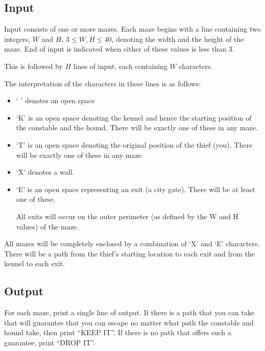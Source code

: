 \subsection*{Input}

Input consists of one or more mazes. Each maze begins with a line
containing two integers, $W$ and $H$, $3 \leq W,H \leq 40$, 
denoting the width and the height of
the maze. End of input is indicated when either of these values is
less than $3$.

This is followed by $H$ lines of input, each containing $W$
characters. 

The interpretation of the characters in these lines is as follows:

\begin{itemize}
\item ` ' denotes an open space

\item `K' is an open space denoting the kennel and hence the starting
position of the constable and the hound.  There will be exactly one of
these in any maze.

\item `T' is an open space denoting the original position of the thief
(you).  There will be exactly one of these in any maze.

\item `X' denotes a wall.

\item `E' is an open space representing an exit (a city gate). There will be at
least one of these. 

    All exits will occur on the outer perimeter (as defined by the W
    and H values) of the maze.

\end{itemize}


All mazes will be completely enclosed by a combination of `X' and `E'
characters.  There will be a path from the thief's starting location
to each exit and from the kennel to each exit.

\subsection*{Output}

For each maze, print a single line of output. If there is a path that
you can take that will guarantee that you can escape no matter what path
the constable and hound take, then print ``KEEP IT''.  If there is
no path that offers such a guarantee, print ``DROP IT''.







